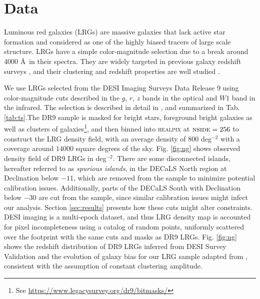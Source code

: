 \section{Data}
\label{sec:data}
Luminous red galaxies (LRGs) are massive galaxies that lack active star formation and considered as one of the highly biased tracers of large scale structure. LRGs have a simple color-magnitude selection due to a break around 4000 \AA~in their spectra. They are widely targeted in previous galaxy redshift surveys , and their clustering and redshift properties are well studied . 

We use LRGs selected from the DESI Imaging Surveys Data Release 9 \citep{dey2018overview} using color-magnitude cuts described in the $g$, $r$, $z$ bands in the optical and $W1$ band in the infrared. The selection is described in detail in \cite{zhou2021clustering}, and summarized in Tab. \ref{tab:ts}.The DR9 sample is masked for bright stars, foreground bright galaxies as well as clusters of galaxies\footnote{See \url{https://www.legacysurvey.org/dr9/bitmasks/}}, and then binned into \textsc{healpix} \citep{gorski2005healpix} at $\textsc{nside}=256$ to construct the LRG density field, with an average density of $800$ deg$^{-2}$ with a coverage around $14000$ square degrees of the sky. Fig. \ref{fig:ng} shows observed density field of DR9 LRGs in deg$^{-2}$. There are some disconnected islands, hereafter referred to as \textit{spurious islands}, in the DECaLS North region at Declination below $-11$, which are removed from the sample to minimize potential calibration issues. Additionally, parts of the DECaLS South with Declination below $-30$ are cut from the sample, since similar calibration issues might infect our analysis. Section \ref{sec:results} presents how these cuts might alter constraints. DESI imaging is a multi-epoch dataset, and thus LRG density map is accounted for pixel incompleteness using a catalog of random points, uniformly scattered over the footprint with the same cuts and masks as DR9 LRGs. Fig. \ref{fig:ng} shows the redshift distribution of DR9 LRGs inferred from DESI Survey Validation  and the evolution of  galaxy bias for our LRG sample adapted from \cite{zhou2021clustering}, consistent with the assumption of constant clustering amplitude. 

